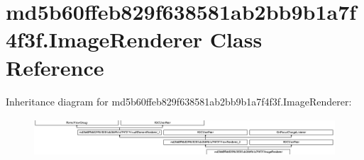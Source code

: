 \hypertarget{classmd5b60ffeb829f638581ab2bb9b1a7f4f3f_1_1ImageRenderer}{}\section{md5b60ffeb829f638581ab2bb9b1a7f4f3f.\+Image\+Renderer Class Reference}
\label{classmd5b60ffeb829f638581ab2bb9b1a7f4f3f_1_1ImageRenderer}
Inheritance diagram for md5b60ffeb829f638581ab2bb9b1a7f4f3f.\+Image\+Renderer\+:\begin{figure}[H]
\begin{center}
\leavevmode
\includegraphics[height=1.403509cm]{classmd5b60ffeb829f638581ab2bb9b1a7f4f3f_1_1ImageRenderer}
\end{center}
\end{figure}
